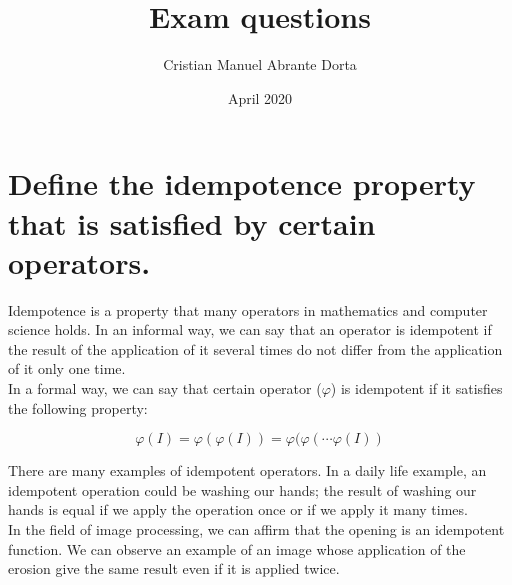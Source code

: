 \documentclass{article}
\title{Exam questions}
\author{Cristian Manuel Abrante Dorta}
\date{April 2020}
\begin{document}
\maketitle

\section{Define the idempotence property that is satisfied by certain operators.}

Idempotence is a property that many operators in mathematics and computer science holds. In an informal way, we can say that an operator is idempotent if the result of the application of it several times do not differ from the application of it only one time.\\

In a formal way, we can say that certain operator ($\varphi$) is idempotent if it satisfies the following property:

\begin{equation}
    \varphi(I) = \varphi(\varphi(I)) = \varphi(\varphi(\cdots \varphi(I))
\end{equation}

There are many examples of idempotent operators. In a daily life example, an idempotent operation could be washing our hands; the result of washing our hands is equal if we apply the operation once or if we apply it many times.\\

In the field of image processing, we can affirm that the opening is an idempotent function. We can observe an example of an image whose application of the erosion give the same result even if it is applied twice.
\end{document}
